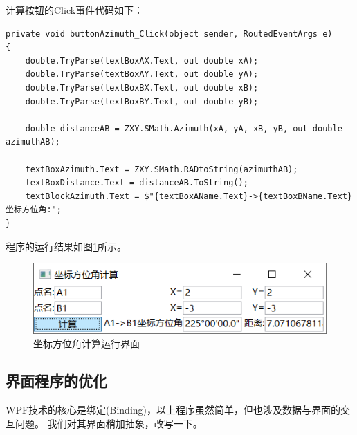 计算按钮的Click事件代码如下：
\begin{lstlisting}
private void buttonAzimuth_Click(object sender, RoutedEventArgs e)
{
    double.TryParse(textBoxAX.Text, out double xA);
    double.TryParse(textBoxAY.Text, out double yA);
    double.TryParse(textBoxBX.Text, out double xB);
    double.TryParse(textBoxBY.Text, out double yB);

    double distanceAB = ZXY.SMath.Azimuth(xA, yA, xB, yB, out double azimuthAB);

    textBoxAzimuth.Text = ZXY.SMath.RADtoString(azimuthAB);
    textBoxDistance.Text = distanceAB.ToString();
    textBlockAzimuth.Text = $"{textBoxAName.Text}->{textBoxBName.Text}坐标方位角:";
}
\end{lstlisting}

程序的运行结果如图\ref{fig:AzimuthUI2}所示。

\begin{figure}[htbp]
    \centering
    \includegraphics[scale=1]{chapter/surveybase/AzimuthUI2.png}
    \caption{坐标方位角计算运行界面}
    \label{fig:AzimuthUI2}
\end{figure}

\subsection{界面程序的优化}

WPF技术的核心是绑定(Binding)，以上程序虽然简单，但也涉及数据与界面的交互问题。
我们对其界面稍加抽象，改写一下。

